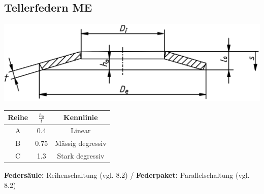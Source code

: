 \subsection{Tellerfedern \hfill ME}
\begin{footnotesize}
    \begin{center}
        \includegraphics[width = 0.7\linewidth]{MAEIP_Tellerfeder}
        \begin{minipage}{0.5\linewidth}
            \begin{scriptsize}
                    \begin{tabular}{|c|c|c|}
                    \hline
                    Reihe & $\frac{h_0}{t}$ & Kennlinie\\
                    \hline
                    A & 0.4 & Linear\\
                    \hline
                    B & 0.75 & Mässig degressiv\\
                    \hline
                    C & 1.3 & Stark degressiv\\
                    \hline
                \end{tabular}
            \end{scriptsize}
        \end{minipage}
        \begin{minipage}{0.48\linewidth}
            \vspace{2mm}
        \end{minipage}
        \par \vspace{2mm}
            \begin{scriptsize}
                \textbf{Federsäule:} Reihenschaltung (vgl. 8.2) / \textbf{Federpaket:} Parallelschaltung (vgl. 8.2)
            \end{scriptsize}
    \end{center}
\end{footnotesize}